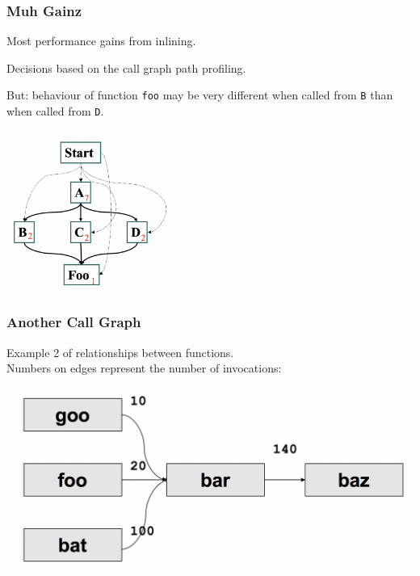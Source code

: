 \begin{frame}
\frametitle{Muh Gainz}



Most performance gains from inlining.

Decisions based on the call graph path profiling. 

But: behaviour of function \texttt{foo} may be very different when called from \texttt{B} than when called from \texttt{D}. 


\begin{center}
	\includegraphics[width=0.4\textwidth]{images/callpaths.png}
\end{center}

\end{frame}



\begin{frame}
\frametitle{Another Call Graph}


Example 2 of relationships between functions.\\
Numbers on edges represent the number of invocations:

\begin{center}
	\includegraphics[width=\textwidth]{images/callpaths2.png}
\end{center}

\end{frame}



